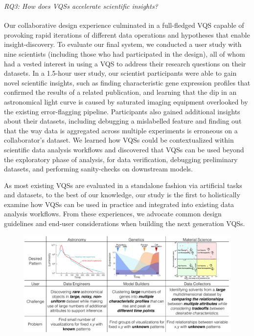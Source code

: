 \emph{RQ3: How does VQSs accelerate scientific insights?}\\
\\ Our collaborative design experience culminated in a full-fledged VQS capable of provoking rapid iterations of different data operations and hypotheses that enable insight-discovery. To evaluate our final system, we conducted a user study with nine scientists (including those who had participated in the design), all of whom had a vested interest in using a VQS to address their research questions on their datasets. In a 1.5-hour user study, our scientist participants were able to gain novel scientific insights, such as %
finding characteristic gene expression profiles that confirmed the results of a related publication, and learning that the dip in an astronomical light curve is caused by saturated imaging equipment overlooked by the existing error-flagging pipeline. 
Participants also gained additional insights about their datasets, including debugging a mislabelled feature and 
finding out that the way data is aggregated across multiple experiments is erroneous on a collaborator's dataset. We learned how VQSs could be contextualized within scientific data analysis workflows and discovered that VQSs can be used beyond the exploratory phase of analysis, for data verification, debugging preliminary datasets, and performing sanity-checks on downstream models.
\par As most existing VQSs are evaluated in a standalone fashion via artificial tasks and datasets, to the best of our knowledge, our study is the first to holistically examine how VQSs can be used in practice and integrated into existing data analysis workflows. From these experiences, we advocate common design guidelines and end-user considerations when building the next generation VQSs.
\begin{figure}[ht!]
\centering
\vspace{-15pt}
\includegraphics[width=0.8\linewidth]{figures/sci_challenge_tbl.pdf}
\vspace{-6pt}
\label{example}
\vspace{-10pt}
\end{figure}